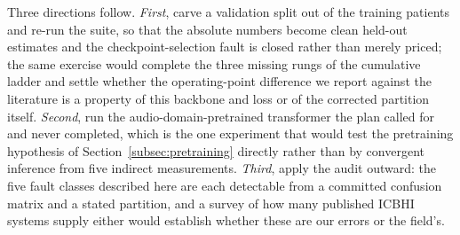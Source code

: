 \documentclass[journal,onecolumn]{IEEEtran}
\begin{document}
Three directions follow. \emph{First}, carve a validation split out of the training
patients and re-run the suite, so that the absolute numbers become clean held-out
estimates and the checkpoint-selection fault is closed rather than merely priced;
the same exercise would complete the three missing rungs of the cumulative ladder
and settle whether the operating-point difference we report against the literature
is a property of this backbone and loss or of the corrected partition itself.
\emph{Second}, run the audio-domain-pretrained transformer the plan called for and
never completed, which is the one experiment that would test the pretraining
hypothesis of Section~\ref{subsec:pretraining} directly rather than by convergent
inference from five indirect measurements. \emph{Third}, apply the audit outward: the
five fault classes described here are each detectable from a committed confusion
matrix and a stated partition, and a survey of how many published ICBHI systems
supply either would establish whether these are our errors or the field's.



\end{document}
